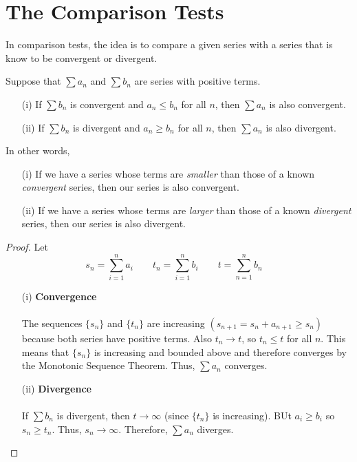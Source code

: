 \section{The Comparison Tests}
  In comparison tests, the idea is to compare a given series with a series that is know to be convergent or divergent.
  \begin{definition}
    Suppose that $\sum a_n$ and $\sum b_n$ are series with positive terms.
    \begin{enumerate}
      \item[(i)] If $\sum b_n$ is convergent and $a_n \leq b_n$ for all $n$, then $\sum a_n$ is also convergent.
      \item[(ii)] If $\sum b_n$ is divergent and $a_n \geq b_n$ for all $n$, then $\sum a_n$ is also divergent.
    \end{enumerate}
  \end{definition}
  In other words,
  \begin{enumerate}
    \item[(i)] If we have a series whose terms are \textit{smaller} than those of a known \textit{convergent} series, then our series is also convergent.
    \item[(ii)] If we have a series whose terms are \textit{larger} than those of a known \textit{divergent} series, then our series is also divergent.
  \end{enumerate}
  \begin{proof}\let\qed\relax
    Let
      $$ s_n = \sum_{i=1}^{n} a_i \qquad t_n = \sum_{i=1}^{n} b_i \qquad t = \sum_{n=1}^{n} b_n \quad $$
    \begin{enumerate}
      \item[(i)] \textbf{Convergence} \\~\\
      The sequences $\{s_n\}$ and $\{t_n\}$ are increasing $(s_{n+1} = s_n + a_{n+1} \geq s_n)$ because both series have positive terms. Also $t_n \to t$, so $t_n \leq t$ for all $n$. This means that $\{s_n\}$ is increasing and bounded above and therefore converges by the Monotonic Sequence Theorem. Thus, $\sum a_n$ converges.
      \item[(ii)] \textbf{Divergence} \\~\\
      If $\sum b_n$ is divergent, then $t\to\infty$ (since $\{t_n\}$ is increasing). BUt $a_i \geq b_i$ so $s_n \geq t_n$. Thus, $s_n \to \infty$. Therefore, $\sum a_n$ diverges.
  \end{enumerate}
  \end{proof}
